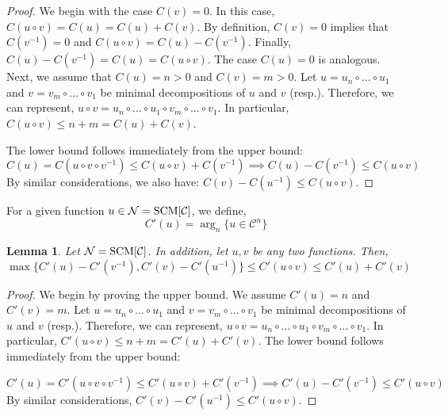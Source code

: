 \documentclass{article} %
\newtheorem{lem}{Lemma}
\begin{document}
\begin{proof} We begin with the case $C(v) = 0$. In this case, $C(u\circ v) = C(u) = C(u) + C(v)$. By definition, $C(v) = 0$ implies that $C(v^{-1}) = 0$ and $C(u\circ v) = C(u) - C(v^{-1})$. Finally, $C(u) - C(v^{-1}) = C(u) = C(u \circ v)$. The case $C(u) = 0$ is analogous. Next, we assume that $C(u) = n>0$ and $C(v)=m>0$. Let $u = u_n \circ ... \circ u_1$ and $v = v_m \circ ... \circ v_1$  be minimal decompositions of $u$ and $v$ (resp.). Therefore, we can represent, $u \circ v = u_n \circ ... \circ u_1 \circ v_m \circ ... \circ v_1$. In particular, $C(u \circ v) \leq n+m = C(u) + C(v)$. 

The lower bound follows immediately from the upper bound:
\begin{equation}
C(u) = C(u \circ v \circ v^{-1}) \leq C(u \circ v) + C(v^{-1})  \implies C(u) - C(v^{-1}) \leq C(u \circ v)
\end{equation}
By similar considerations, we also have: $C(v) - C(u^{-1}) \leq C(u \circ v)$.
\end{proof}

For a given function $u\in \mathcal{N} =  \textnormal{SCM}[\mathcal{C}]$, we define, 
\begin{equation}
C'(u) = \arg_n \{u \in \mathcal{C}^n\}
\end{equation}

 

\begin{lem}\label{lem:A2} Let $\mathcal{N} =  \textnormal{SCM}[\mathcal{C}]$. In addition, let $u,v$ be any two functions. Then,
\begin{equation}
\max \{C'(u) - C'(v^{-1}), C'(v) - C'(u^{-1})\} \leq C'(u\circ v) \leq C'(u) + C'(v)
\end{equation}
\end{lem}

\begin{proof} We begin by proving the upper bound. We assume $C'(u) = n$ and $C'(v)=m$. Let $u = u_n \circ ... \circ u_1$ and $v = v_m \circ ... \circ v_1$  be minimal decompositions of $u$ and $v$ (resp.). Therefore, we can represent, $u \circ v = u_n \circ ... \circ u_1 \circ v_m \circ ... \circ v_1$. In particular, $C'(u \circ v) \leq n+m = C'(u) + C'(v)$. The lower bound follows immediately from the upper bound:

\begin{equation}
C'(u) = C'(u \circ v \circ v^{-1}) \leq C'(u \circ v) + C'(v^{-1})  \implies C'(u) - C'(v^{-1}) \leq C'(u \circ v)
\end{equation}
By similar considerations, $C'(v) - C'(u^{-1}) \leq C'(u \circ v)$.
\end{proof}
\end{document}
